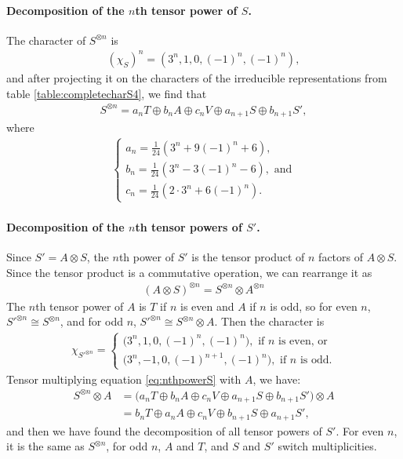 \paragraph{Decomposition of the $n$th tensor power of $S$.} The character of $S^{\otimes n}$ is 
\begin{align}
	(\chi_S)^n = (3^n, 1, 0, (-1)^n, (-1)^n),
\end{align}
and after projecting it on the characters of the irreducible representations from table \ref{table:completecharS4}, we find that
\begin{align}\label{eq:nthpowerS}
	S^{\otimes n} = a_n T \oplus b_n A \oplus c_n V \oplus a_{n+1} S \oplus b_{n+1} S',
\end{align}
where 
\begin{align}
	\begin{cases}
		a_n = \frac{1}{24}(3^n + 9(-1)^n+6), \\
		b_n = \frac{1}{24}(3^n - 3(-1)^n -6), \text{ and} \\
		c_n = \frac{1}{24}(2\cdot 3^n + 6(-1)^n).
	\end{cases}
\end{align}

\paragraph{Decomposition of the $n$th tensor powers of $S'$.} Since $S' = A \otimes S$, the $n$th power of $S'$ is the tensor product of $n$ factors of $A \otimes S$. Since the tensor product is a commutative operation, we can rearrange it as
\begin{align}
	(A \otimes S)^{\otimes n} = S^{\otimes n} \otimes A^{\otimes n}
\end{align}
The $n$th tensor power of $A$ is $T$ if $n$ is even and $A$ if $n$ is odd, so for even $n$, $S'^{\otimes n} \cong S^{\otimes n}$, and for odd $n$, $S'^{\otimes n} \cong S^{\otimes n} \otimes A$. Then the character is 
\begin{align}
	\chi_{S'^{\otimes n}} = \begin{cases}
		\big(3^n,1,0,(-1)^{n}, (-1)^n\big), \text{ if } n \text{ is even, or} \\
		\big(3^n,-1,0,(-1)^{n+1}, (-1)^n\big), \text{ if } n \text{ is odd.}
	\end{cases}
\end{align}
Tensor multiplying equation \ref{eq:nthpowerS} with $A$, we have:
\begin{align}
	S^{\otimes n} \otimes A &= \Big(a_n T \oplus b_n A \oplus c_n V \oplus a_{n+1} S \oplus b_{n+1} S'\Big)\otimes A \\
	&= b_n T \oplus a_n A \oplus c_n V \oplus b_{n+1} S \oplus a_{n+1} S',
\end{align}
and then we have found the decomposition of all tensor powers of $S'$. For even $n$, it is the same as $S^{\otimes n}$, for odd $n$, $A$ and $T$, and $S$ and $S'$ switch multiplicities.

